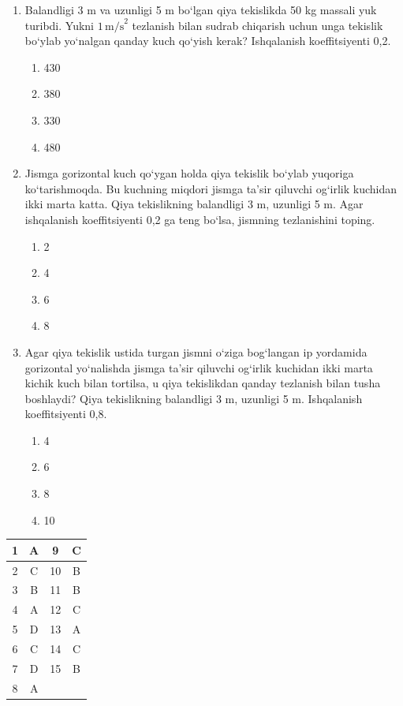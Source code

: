\begin{enumerate}
\item Balandligi 3 m va uzunligi 5 m
bo‘lgan qiya tekislikda
50 kg massali yuk turibdi.
Yukni $1\,\text{m/s}^2$ tezlanish
bilan sudrab chiqarish uchun
unga tekislik bo‘ylab yo‘nalgan
qanday kuch qo‘yish kerak?
Ishqalanish koeffitsiyenti 0,2.

\begin{enumerate}[label=\Alph*)]
\item 430
\item 380
\item 330
\item 480
\end{enumerate}

\item Jismga gorizontal kuch qo‘ygan holda
qiya tekislik bo‘ylab yuqoriga ko‘tarishmoqda.
Bu kuchning miqdori jismga ta’sir qiluvchi
og‘irlik kuchidan ikki marta katta.
Qiya tekislikning balandligi 3 m,
uzunligi 5 m.
Agar ishqalanish koeffitsiyenti
0,2 ga teng bo‘lsa,
jismning tezlanishini toping.

\begin{enumerate}[label=\Alph*)]
\item 2
\item 4
\item 6
\item 8
\end{enumerate}

\item Agar qiya tekislik ustida turgan jismni
o‘ziga bog‘langan ip yordamida
gorizontal yo‘nalishda
jismga ta’sir qiluvchi og‘irlik kuchidan
ikki marta kichik kuch bilan tortilsa,
u qiya tekislikdan qanday tezlanish
bilan tusha boshlaydi?
Qiya tekislikning balandligi 3 m,
uzunligi 5 m.
Ishqalanish koeffitsiyenti 0,8.

\begin{enumerate}[label=\Alph*)]
\item 4
\item 6
\item 8
\item 10
\end{enumerate}

\end{enumerate}



\begin{center}
\begin{tabular}{|c|c||c|c|}
\hline
1 & A & 9 & C \\
\hline
2 & C & 10 & B \\
\hline
3 & B & 11 & B \\
\hline
4 & A & 12 & C \\
\hline
5 & D & 13 & A \\
\hline
6 & C & 14 & C \\
\hline
7 & D & 15 & B \\
\hline
8 & A &  &  \\
\hline
\end{tabular}
\end{center}

